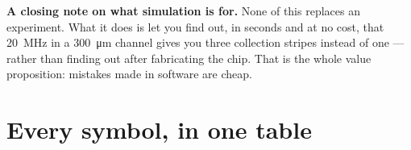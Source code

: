 \documentclass[11pt,a4paper]{article}
\begin{document}
\vfill

\begin{center}
\begin{minipage}{0.9\textwidth}
\small\color{muted}
\textbf{A closing note on what simulation is for.} None of this replaces an
experiment. What it does is let you find out, in seconds and at no cost, that
\SI{20}{\mega\hertz} in a \SI{300}{\micro\meter} channel gives you three
collection stripes instead of one --- rather than finding out after fabricating
the chip. That is the whole value proposition: mistakes made in software are
cheap.
\end{minipage}
\end{center}

\clearpage
\appendix
\section{Every symbol, in one table}
\end{document}
